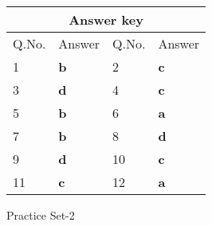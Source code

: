 \setlength\arrayrulewidth{1pt}
\begin{table}[H]
	\centering
	\begin{tabular}{|p{1.5cm}|p{1.5cm}||p{1.5cm}|p{1.5cm}|}
		\hline
		\multicolumn{4}{|c|}{\textbf{Answer key}}\\\hline\hline
		\rowcolor{ocrel}Q.No.&Answer&Q.No.&Answer\\\hline
		1&\textbf{b} &2&\textbf{c}\\\hline 
		3&\textbf{d} &4&\textbf{c} \\\hline
		5&\textbf{b} &6&\textbf{a} \\\hline
		7&\textbf{b}&8&\textbf{d}\\\hline
		9&\textbf{d}&10&\textbf{c}\\\hline
		11&\textbf{c} &12&\textbf{a}\\\hline
		
	\end{tabular}
\end{table}
\newpage
\begin{abox}
	Practice Set-2
\end{abox}
